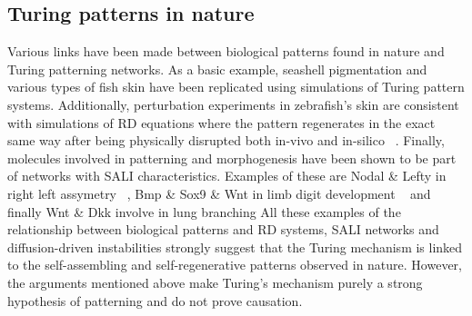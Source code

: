 \subsection{Turing patterns in nature}
Various links have been made between biological patterns found in nature and Turing patterning networks.
As a basic example, seashell pigmentation and various types of fish skin have been replicated using simulations of Turing pattern systems.
Additionally, perturbation experiments in zebrafish’s skin are consistent with simulations of RD equations where the pattern regenerates in the exact same way after being physically disrupted both in-vivo and in-silico ~\parencite{Kondo2010a}.
Finally, molecules involved in patterning and morphogenesis have been shown to be part of networks with SALI characteristics.
Examples of these are Nodal \& Lefty in right left assymetry ~\parencite{Nakamura2006}, Bmp \& Sox9 \& Wnt in limb digit development ~\parencite{J.Raspopovic1*L.Marcon1*L.Russo1J.Sharpe12014} and finally Wnt \& Dkk involve in lung branching %
All these examples of the relationship between biological patterns and RD systems, SALI networks and diffusion-driven instabilities strongly suggest that the Turing mechanism is linked to the self-assembling and self-regenerative patterns observed in nature.
However, the arguments mentioned above make Turing’s mechanism purely a strong hypothesis of patterning and do not prove causation.
